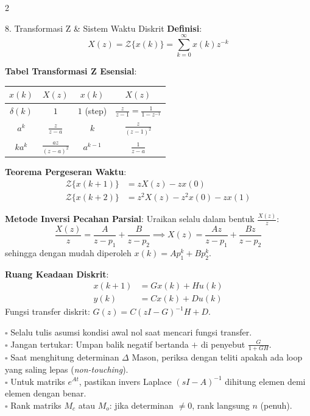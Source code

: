 \documentclass[10pt,a4paper]{article}
\begin{document}
\begin{multicols*}{2}
\begin{rumusbox}{8. Transformasi Z \& Sistem Waktu Diskrit}
\textbf{Definisi}:
$$X(z) = \mathcal{Z}\{x(k)\} = \sum_{k=0}^\infty x(k) z^{-k}$$

\textbf{Tabel Transformasi Z Esensial}:
\begin{center}
\renewcommand{\arraystretch}{1.2}
\scriptsize
\begin{tabular}{cc|cc}
\toprule
$x(k)$ & $X(z)$ & $x(k)$ & $X(z)$ \\
\midrule
$\delta(k)$ & $1$ & $1$ (step) & $\frac{z}{z-1} = \frac{1}{1-z^{-1}}$ \\
$a^k$ & $\frac{z}{z-a}$ & $k$ & $\frac{z}{(z-1)^2}$ \\
$k a^k$ & $\frac{a z}{(z-a)^2}$ & $a^{k-1}$ & $\frac{1}{z-a}$ \\
\bottomrule
\end{tabular}
\end{center}

\textbf{Teorema Pergeseran Waktu}:
\begin{align*}
    \mathcal{Z}\{x(k+1)\} &= z X(z) - z x(0)\\
    \mathcal{Z}\{x(k+2)\} &= z^2 X(z) - z^2 x(0) - z x(1)
\end{align*}

\textbf{Metode Inversi Pecahan Parsial}:
Uraikan selalu dalam bentuk $\frac{X(z)}{z}$:
$$\frac{X(z)}{z} = \frac{A}{z - p_1} + \frac{B}{z - p_2} \implies X(z) = \frac{A z}{z - p_1} + \frac{B z}{z - p_2}$$
sehingga dengan mudah diperoleh $x(k) = A p_1^k + B p_2^k$.

\textbf{Ruang Keadaan Diskrit}:
\begin{align*}
    x(k+1) &= G x(k) + H u(k)\\
    y(k) &= C x(k) + D u(k)
\end{align*}
Fungsi transfer diskrit: $G(z) = C(zI - G)^{-1}H + D$.
\end{rumusbox}

\begin{tipbox}
$\square$ Selalu tulis asumsi kondisi awal nol saat mencari fungsi transfer.\\
$\square$ Jangan tertukar: Umpan balik negatif bertanda $+$ di penyebut $\frac{G}{1+GH}$.\\
$\square$ Saat menghitung determinan $\Delta$ Mason, periksa dengan teliti apakah ada loop yang saling lepas (\textit{non-touching}).\\
$\square$ Untuk matriks $e^{At}$, pastikan invers Laplace $(sI - A)^{-1}$ dihitung elemen demi elemen dengan benar.\\
$\square$ Rank matriks $M_c$ atau $M_o$: jika determinan $\ne 0$, rank langsung $n$ (penuh).
\end{tipbox}

\end{multicols*}
\end{document}
